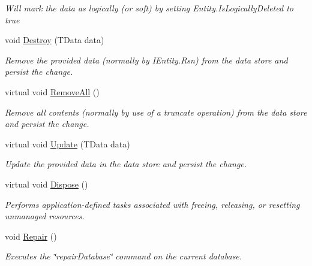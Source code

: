 \begin{DoxyCompactItemize}
\begin{DoxyCompactList}\small\item\em Will mark the {\itshape data}  as logically (or soft) by setting Entity.\+Is\+Logically\+Deleted to true \end{DoxyCompactList}\item 
void \hyperlink{classCqrs_1_1Mongo_1_1DataStores_1_1MongoDataStore_af97319aef1f0484666d9ea12578b8df9_af97319aef1f0484666d9ea12578b8df9}{Destroy} (T\+Data data)
\begin{DoxyCompactList}\small\item\em Remove the provided {\itshape data}  (normally by I\+Entity.\+Rsn) from the data store and persist the change. \end{DoxyCompactList}\item 
virtual void \hyperlink{classCqrs_1_1Mongo_1_1DataStores_1_1MongoDataStore_a878966ea796321cae54c3c619e3178d5_a878966ea796321cae54c3c619e3178d5}{Remove\+All} ()
\begin{DoxyCompactList}\small\item\em Remove all contents (normally by use of a truncate operation) from the data store and persist the change. \end{DoxyCompactList}\item 
virtual void \hyperlink{classCqrs_1_1Mongo_1_1DataStores_1_1MongoDataStore_a03aac0495445d34f124db893cd09cbd8_a03aac0495445d34f124db893cd09cbd8}{Update} (T\+Data data)
\begin{DoxyCompactList}\small\item\em Update the provided {\itshape data}  in the data store and persist the change. \end{DoxyCompactList}\item 
virtual void \hyperlink{classCqrs_1_1Mongo_1_1DataStores_1_1MongoDataStore_a4af729196a5fa4962961c9ce38b74891_a4af729196a5fa4962961c9ce38b74891}{Dispose} ()
\begin{DoxyCompactList}\small\item\em Performs application-\/defined tasks associated with freeing, releasing, or resetting unmanaged resources. \end{DoxyCompactList}\item 
void \hyperlink{classCqrs_1_1Mongo_1_1DataStores_1_1MongoDataStore_a1c26771b4a655e138b55b8082795a52f_a1c26771b4a655e138b55b8082795a52f}{Repair} ()
\begin{DoxyCompactList}\small\item\em Executes the \char`\"{}repair\+Database\char`\"{} command on the current database. \end{DoxyCompactList}\end{DoxyCompactItemize}
